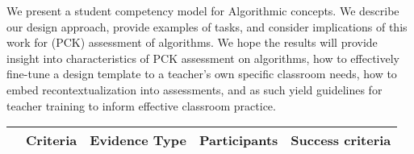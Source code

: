 We present a student competency model for Algorithmic concepts. We describe our design approach, provide examples of tasks, and consider implications of this work for (PCK) assessment of algorithms. We hope the results will provide insight into characteristics of PCK assessment on algorithms, how to effectively fine-tune a design template to a teacher's own specific classroom needs, how to embed recontextualization into assessments, and as such yield guidelines for teacher training to inform effective classroom practice.


\begin{table*}
  \centering
\begin{tabular}{|c|p{30mm}|p{33mm}|p{30mm}|p{43mm}|}
   \hline
   & \textbf{Criteria} & \textbf{Evidence Type} & \textbf{Participants} & \textbf{Success criteria}\\
  \hline


\end{tabular}
\end{table*}
